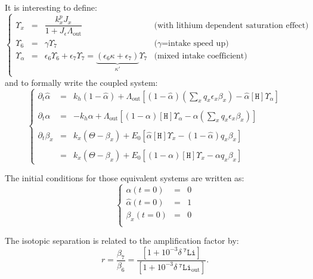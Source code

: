 \documentclass[aps,onecolumn,12pt]{revtex4}
\newcommand{\mychem}[1]{\mathtt{#1}}
\newcommand{\myconc}[1]{\left\lbrack{#1}\right\rbrack}
\newcommand{\spLi}[1]{{~^{\mychem{#1}}\mychem{Li}}}
\newcommand{\spproton}{\mychem{H}}
\newcommand{\proton}{\myconc{\spproton}}
\newcommand{\deltaLi}{ {\delta\!\!\!\spLi{7}} }
\newcommand{\deltaLiOut}{{\deltaLi}_{\mathrm{out}}}
\newcommand{\LiAll}{\Lambda}
\newcommand{\LiAllOut}{{\LiAll}_{\mathrm{out}}}
\begin{document}
It is interesting to define:
\begin{equation}
\label{eq:upsilon}
\left\lbrace
\begin{array}{rcll}
	\Upsilon_x & = & \dfrac{k^p_x J_x}{1+J_\epsilon \LiAllOut} & \text{(with lithium dependent saturation effect)}\\
	\Upsilon_6 & = & \gamma \Upsilon_7 & \text{($\gamma$=intake speed up)} \\
	\Upsilon_\alpha & = & \epsilon_6 \Upsilon_6 + \epsilon_7 \Upsilon_7 = \underbrace{(\epsilon_6 \kappa + \epsilon_7)}_{\kappa'} \Upsilon_7 & 
	\text{(mixed intake coefficient)}\\
\end{array}
\right.
\end{equation}
and to formally write the coupled system:
\begin{equation}
\label{eq:sysall}
\left\lbrace
\begin{array}{rcl}
\partial_t \hat\alpha & = &
	 k_h \left(1-\hat\alpha\right) 
	 + \LiAllOut \left[ (1-\hat\alpha) \left( {\sum_x q_x \epsilon_x \beta_x} \right)  - \hat\alpha\proton \Upsilon_\alpha \right]\\
	 \\
\partial_t \alpha & = & -k_h \alpha + \LiAllOut \left[ (1-\alpha) \proton  \Upsilon_\alpha
	-\alpha  \left(\sum_x q_x \epsilon_x \beta_x \right)\right]\\
\\
	\partial_t \beta_x & = & k_x\left(\Theta - \beta_x\right) +E_0\left[ \hat\alpha  \proton \Upsilon_x - (1-\hat\alpha) q_x\beta_x \right]\\
	\\
	 & = & k_x\left(\Theta - \beta_x\right) +E_0\left[ (1-\alpha)  \proton \Upsilon_x - \alpha q_x \beta_x \right]
\end{array}
\right.
\end{equation}

The initial conditions for those equivalent systems are written as:
\begin{equation}
\label{eq:ini}
\left\lbrace
\begin{array}{rcl}
\alpha(t=0) & = & 0\\
\hat\alpha(t=0) &= & 1\\
\beta_x(t=0)    &=& 0\\
\end{array}
\right.
\end{equation}

The isotopic separation is related to the amplification factor by:
\begin{equation}
	r=\dfrac{ \beta_7}{\beta_6} = \dfrac{\left[1+10^{-3}\deltaLi\right]}{\left[1+10^{-3}\deltaLiOut\right]}
	.
\end{equation}
\end{document}
